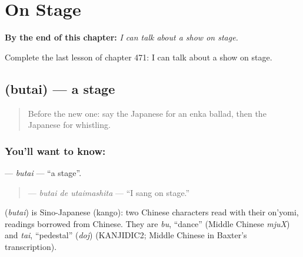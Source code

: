 
\chapter{On Stage}
\label{ch:ja-on-stage}

\begin{chapteropening}
\textbf{By the end of this chapter:} \emph{I can talk about a show on stage.}

Complete the last lesson of chapter 471: I can talk about a show on stage.
\end{chapteropening}

\section[\texorpdfstring{\ja{ぶたい} (butai)}{ぶたい (butai)}]{ (butai) — a stage}

\label{lesson:JA-C471-butai}



\begin{quote}
Before the new one: say the Japanese for an enka ballad, then the Japanese for whistling.
\end{quote}

\subsection*{You'll want to know: }
\textbf{} — \emph{butai} — \textquotedblleft{}a stage\textquotedblright{}.

\begin{quote}
\textbf{ } — \emph{butai de utaimashita} — \textquotedblleft{}I sang on stage.\textquotedblright{}
\end{quote}

\begin{cousinweb}
\textbf{} (\emph{butai}) is Sino-Japanese (kango): two Chinese characters read with their on'yomi, readings borrowed from Chinese. They are \emph{bu}, \textquotedblleft{}dance\textquotedblright{} (Middle Chinese \emph{mjuX}) and \emph{tai}, \textquotedblleft{}pedestal\textquotedblright{} (\emph{doj}) (KANJIDIC2; Middle Chinese in Baxter's transcription).
\end{cousinweb}

